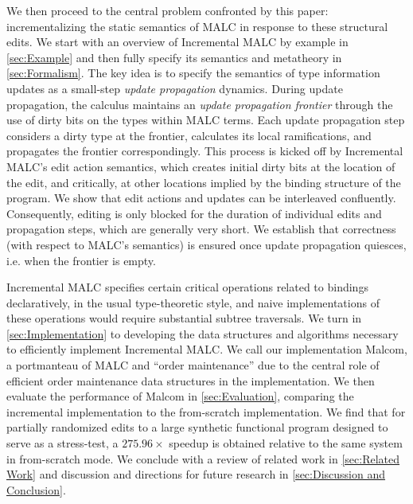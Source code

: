 We then proceed to the central problem confronted by this paper: incrementalizing the static semantics of MALC in response to these structural edits. We start with an overview of Incremental MALC by example in \autoref{sec:Example} and then fully specify its semantics and metatheory in \autoref{sec:Formalism}. The key idea is to specify the semantics of type information updates as a small-step \emph{update propagation} dynamics. During update propagation, the calculus maintains an \emph{update propagation frontier} through the use of dirty bits on the types within MALC terms. Each update propagation step considers a dirty type at the frontier, calculates its local ramifications, and propagates the frontier correspondingly. This process is kicked off by Incremental MALC's edit action semantics, which creates initial dirty bits at the location of the edit, and critically, at other locations implied by the binding structure of the program. We show that edit actions and updates can be interleaved confluently. Consequently, editing is only blocked for the duration of individual edits and propagation steps, which are generally very short. We establish that correctness (with respect to MALC's semantics) is ensured once update propagation quiesces, i.e. when the frontier is empty.

Incremental MALC specifies certain critical operations related to bindings declaratively, in the usual type-theoretic style, and naive implementations of these operations would require substantial subtree traversals. We turn in \autoref{sec:Implementation} to developing the data structures and algorithms necessary to efficiently implement Incremental MALC. We call our implementation Malcom, a portmanteau of MALC and ``order maintenance'' due to the central role of efficient order maintenance data structures in the implementation. 
We then evaluate the performance of Malcom in \autoref{sec:Evaluation}, comparing the incremental implementation to the from-scratch implementation. We find that for partially randomized edits to a large synthetic functional program designed to serve as a stress-test, a $275.96\times$ speedup is obtained relative to the same system in from-scratch mode.
We conclude with a review of related work in \autoref{sec:Related Work} and discussion and directions for future research in \autoref{sec:Discussion and Conclusion}.

